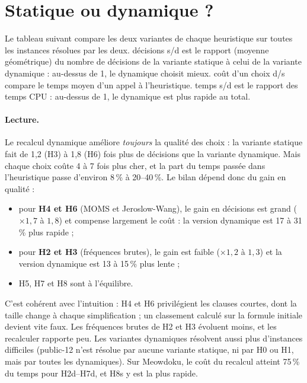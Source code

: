 \documentclass[11pt,a4paper]{article}
\begin{document}
\section{Statique ou dynamique ?}

Le tableau suivant compare les deux variantes de chaque heuristique sur
toutes les instances résolues par les deux. \og décisions s/d \fg{} est le
rapport (moyenne géométrique) du nombre de décisions de la variante
statique à celui de la variante dynamique : au-dessus de 1, le dynamique
choisit mieux. \og coût d'un choix d/s \fg{} compare le temps moyen d'un
appel à l'heuristique. \og temps s/d \fg{} est le rapport des temps CPU :
au-dessus de 1, le dynamique est plus rapide au total.
\begin{center}\small

\end{center}

\paragraph{Lecture.} Le recalcul dynamique améliore \emph{toujours} la
qualité des choix : la variante statique fait de 1,2 (H3) à 1,8 (H6) fois
plus de décisions que la variante dynamique. Mais
chaque choix coûte 4 à 7 fois plus cher, et la part du temps passée dans
l'heuristique passe d'environ 8\,\% à 20--40\,\%. Le bilan dépend donc du
gain en qualité :
\begin{itemize}
  \item pour \textbf{H4 et H6} (MOMS et Jeroslow-Wang), le gain en
    décisions est grand ($\times 1{,}7$ à $1{,}8$) et compense largement le
    coût : la version dynamique est 17 à 31\,\% plus rapide ;
  \item pour \textbf{H2 et H3} (fréquences brutes), le gain est faible
    ($\times 1{,}2$ à $1{,}3$) et la version dynamique est 13 à 15\,\% plus
    lente ;
  \item H5, H7 et H8 sont à l'équilibre.
\end{itemize}
C'est cohérent avec l'intuition : H4 et H6 privilégient les clauses courtes,
dont la taille change à chaque simplification ; un classement calculé sur
la formule initiale devient vite faux. Les fréquences brutes de H2 et H3
évoluent moins, et les recalculer rapporte peu. Les variantes dynamiques
résolvent aussi plus d'instances difficiles (public-12 n'est résolue par
aucune variante statique, ni par H0 ou H1, mais par toutes les
dynamiques). Sur
Meowdoku, le coût du recalcul atteint 75\,\% du temps pour H2d--H7d, et
H8s y est la plus rapide.
\end{document}
